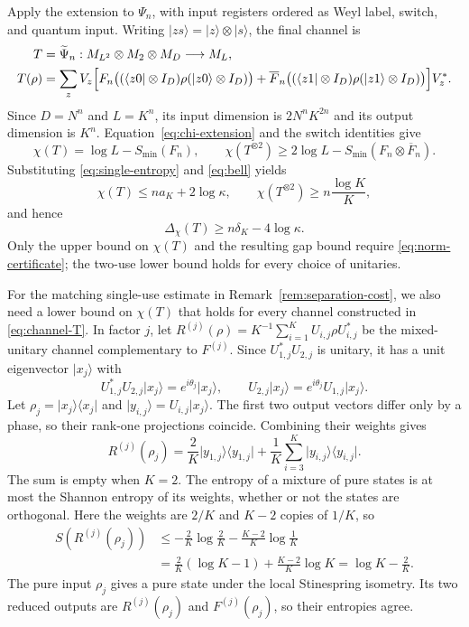 \documentclass[11pt]{article}
\numberwithin{equation}{section}
\theoremstyle{boldremark}\newtheorem{remark}[theorem]{Remark}
\newcommand{\M}{M}
\newcommand{\smin}{S_{\min}}
\newcommand{\ket}[1]{\lvert #1\rangle}
\newcommand{\bra}[1]{\langle #1\rvert}
\begin{document}
Apply the extension to $\Psi_n$, with input registers ordered as
Weyl label, switch, and quantum input. Writing
$\ket{zs}=\ket z\otimes\ket s$, the final channel is
\begin{equation}
 \begin{aligned}
 T&=\widetilde\Psi_n:\M_{L^2}\otimes\M_2\otimes\M_D\longrightarrow\M_L,\\
 T(\rho)&=\sum_zV_z\Bigl[
 F_n\bigl((\bra{z0}\otimes I_D)\rho(\ket{z0}\otimes I_D)\bigr)
 +\overline F_n\bigl((\bra{z1}\otimes I_D)\rho
                         (\ket{z1}\otimes I_D)\bigr)\Bigr]V_z^*.
 \end{aligned}
 \label{eq:channel-T}
\end{equation}
Since $D=N^n$ and $L=K^n$, its input dimension is $2N^nK^{2n}$ and
its output dimension is $K^n$. Equation~\eqref{eq:chi-extension} and
the switch identities give
\[
 \chi(T)=\log L-\smin(F_n),
 \qquad \chi(T^{\otimes2})\ge2\log L-
                                  \smin(F_n\otimes\overline F_n).
\]
Substituting \eqref{eq:single-entropy} and \eqref{eq:bell} yields
\begin{equation}
 \chi(T)\le na_K+2\log\kappa,
 \qquad \chi(T^{\otimes2})\ge n\frac{\log K}{K},
 \label{eq:certificate-holevo}
\end{equation}
and hence
\begin{equation}
 \Delta_\chi(T)\ge n\delta_K-4\log\kappa.
 \label{eq:certificate-gap}
\end{equation}
Only the upper bound on $\chi(T)$ and the resulting gap bound
require \eqref{eq:norm-certificate}; the two-use lower bound holds
for every choice of unitaries.

For the matching single-use estimate in Remark~\ref{rem:separation-cost},
we also need a lower bound on $\chi(T)$ that holds for every channel
constructed in \eqref{eq:channel-T}. In factor $j$, let
$R^{(j)}(\rho)=K^{-1}\sum_{i=1}^K U_{i,j}\rho U_{i,j}^*$
be the mixed-unitary channel complementary to $F^{(j)}$.
Since $U_{1,j}^*U_{2,j}$ is unitary, it has a unit eigenvector
$\ket{x_j}$ with
\[
 U_{1,j}^*U_{2,j}\ket{x_j}=e^{i\theta_j}\ket{x_j},
 \qquad
 U_{2,j}\ket{x_j}=e^{i\theta_j}U_{1,j}\ket{x_j}.
\]
Let $\rho_j=\ket{x_j}\bra{x_j}$ and
$\ket{y_{i,j}}=U_{i,j}\ket{x_j}$. The first two output vectors differ
only by a phase, so their rank-one projections coincide. Combining
their weights gives
\[
 R^{(j)}(\rho_j)
 =\frac2K\ket{y_{1,j}}\bra{y_{1,j}}
  +\frac1K\sum_{i=3}^K\ket{y_{i,j}}\bra{y_{i,j}}.
\]
The sum is empty when $K=2$. The entropy of a mixture of pure states
is at most the Shannon entropy of its weights, whether or not the
states are orthogonal. Here the weights are $2/K$ and $K-2$ copies
of $1/K$, so
\[
 \begin{aligned}
 S(R^{(j)}(\rho_j))
 &\le-\frac2K\log\frac2K-\frac{K-2}{K}\log\frac1K\\
 &=\frac2K(\log K-1)+\frac{K-2}{K}\log K
 =\log K-\frac2K.
 \end{aligned}
\]
The pure input $\rho_j$ gives a pure state under the local Stinespring
isometry. Its two reduced outputs are $R^{(j)}(\rho_j)$ and
$F^{(j)}(\rho_j)$, so their entropies agree.
\end{document}

